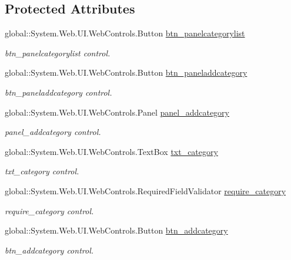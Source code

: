 \subsection*{Protected Attributes}
\begin{DoxyCompactItemize}
\item 
global\+::\+System.\+Web.\+U\+I.\+Web\+Controls.\+Button \mbox{\hyperlink{class_admin__category_a2567adbd53297aa5cf0bd79f0ff927d1}{btn\+\_\+panelcategorylist}}
\begin{DoxyCompactList}\small\item\em btn\+\_\+panelcategorylist control. \end{DoxyCompactList}\item 
global\+::\+System.\+Web.\+U\+I.\+Web\+Controls.\+Button \mbox{\hyperlink{class_admin__category_adf1d24757fb8fcc75e9792f3b35ccad0}{btn\+\_\+paneladdcategory}}
\begin{DoxyCompactList}\small\item\em btn\+\_\+paneladdcategory control. \end{DoxyCompactList}\item 
global\+::\+System.\+Web.\+U\+I.\+Web\+Controls.\+Panel \mbox{\hyperlink{class_admin__category_a372cd5bc07356b2a44a95822f1711811}{panel\+\_\+addcategory}}
\begin{DoxyCompactList}\small\item\em panel\+\_\+addcategory control. \end{DoxyCompactList}\item 
global\+::\+System.\+Web.\+U\+I.\+Web\+Controls.\+Text\+Box \mbox{\hyperlink{class_admin__category_a616af427134e04a69b88ce443727449a}{txt\+\_\+category}}
\begin{DoxyCompactList}\small\item\em txt\+\_\+category control. \end{DoxyCompactList}\item 
global\+::\+System.\+Web.\+U\+I.\+Web\+Controls.\+Required\+Field\+Validator \mbox{\hyperlink{class_admin__category_a85b2bad15e0b0cd92ce61f736e9bffd3}{require\+\_\+category}}
\begin{DoxyCompactList}\small\item\em require\+\_\+category control. \end{DoxyCompactList}\item 
global\+::\+System.\+Web.\+U\+I.\+Web\+Controls.\+Button \mbox{\hyperlink{class_admin__category_af62f46ac8fd359b679c2f0facb544ea0}{btn\+\_\+addcategory}}
\begin{DoxyCompactList}\small\item\em btn\+\_\+addcategory control. \end{DoxyCompactList}\item 

\end{DoxyCompactItemize}
